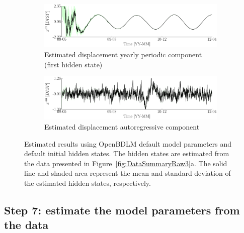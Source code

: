 \begin{figure}[h!]
\ContinuedFloat
\begin{subfigure}{\linewidth}
\includegraphics[width=0.9\linewidth]{./docfigs/Example_DISPSIM_ANOMALY/default/DISP_S1_4.pdf}
\caption{Estimated displacement yearly periodic component (first hidden state)}
\end{subfigure}
\begin{subfigure}{\linewidth}
\includegraphics[width=0.9\linewidth]{./docfigs/Example_DISPSIM_ANOMALY/default/DISP_AR_6.pdf} 
\caption{Estimated displacement autoregressive component}
\end{subfigure}
\caption{Estimated results using OpenBDLM default model parameters and default initial hidden states. The hidden states are estimated from the data presented in Figure~\ref{fig:DataSummaryRaw3}a. The solid line and shaded area represent the mean and standard deviation of the estimated hidden states, respectively.}
\label{fig:DISPSIMANOMALYDefaultDefaultExample3}
\end{figure}

\subsection{Step 7: estimate the model parameters from the data}

